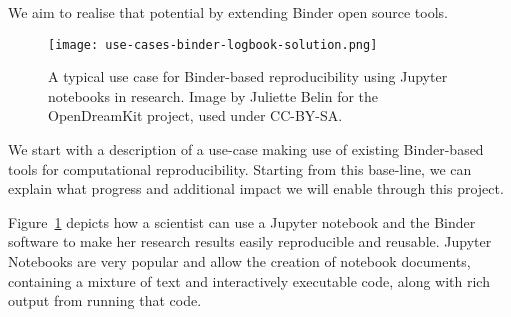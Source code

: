 We aim to realise that potential by extending Binder open source tools.

\begin{figure}[htb]\centering
  \texttt{[image: use-cases-binder-logbook-solution.png]}
  \caption{A typical use case for Binder-based reproducibility using Jupyter notebooks in research.
            Image by Juliette Belin for the OpenDreamKit project, used under
            CC-BY-SA.}\label{fig:use-cases-binder}
\end{figure}

We start with a description of a use-case making use of existing Binder-based
tools for computational reproducibility. Starting from this base-line, we can
explain what progress and additional impact we will enable through this project.

Figure~\ref{fig:use-cases-binder} depicts how a scientist can use a Jupyter
notebook and the Binder software to make her research results easily
reproducible and reusable. Jupyter Notebooks are very popular and allow the creation of notebook
documents, containing a mixture of text and interactively executable code, along with rich output from
running that code.

